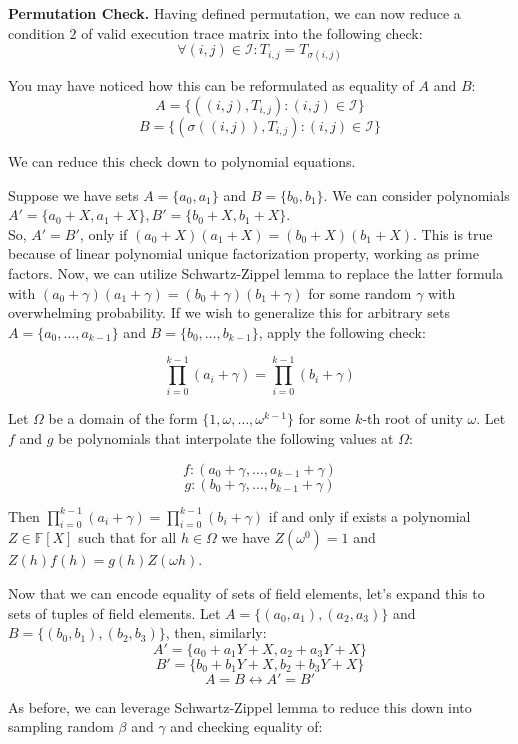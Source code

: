 \documentclass[../lecture-notes.tex]{subfiles}
\begin{document}
\textcolor{blue!80!black}{\textbf{Permutation Check.}} Having defined permutation, we can now reduce a condition $2$ of valid execution trace matrix into the following check:
\[\forall (i, j) \in \mathcal{I}: T_{i,j} = T_{\sigma(i,j)}\]

You may have noticed how this can be reformulated as equality of $A$ and $B$:
\[A = \{((i, j), T_{i,j}) : (i, j) \in \mathcal{I}\}\]
\[B = \{(\sigma((i, j)), T_{i,j}) : (i, j) \in \mathcal{I}\}\]

We can reduce this check down to polynomial equations.

Suppose we have sets \(A = \{a_0, a_1\}\) and \(B = \{b_0, b_1\}\). We can consider polynomials \(A' = \{a_0 + X, a_1 + X\}, B' = \{b_0 + X, b_1 + X\}\). 
\\
So, \(A' = B'\), only if \((a_0 + X)(a_1 + X) = (b_0 + X)(b_1 + X)\). This is
true because of linear polynomial unique factorization property, working as
prime factors. Now, we can utilize Schwartz-Zippel lemma to replace the latter
formula with \((a_0 + \gamma)(a_1 + \gamma) = (b_0 + \gamma)(b_1 + \gamma)\) for
some random $\gamma$ with overwhelming probability. If we wish to generalize this
for arbitrary sets \(A = \{a_0, \ldots, a_{k-1}\}\) and \(B = \{b_0, \ldots, b_{k-1}\}\), apply the following check:

\[\prod_{i=0}^{k-1} (a_i + \gamma) = \prod_{i=0}^{k-1} (b_i + \gamma)\]

Let $\Omega$ be a domain of the form \(\{1, \omega, \dots, \omega^{k-1}\}\) for some $k$-th root of unity $\omega$. Let $f$ and $g$ be polynomials that interpolate the following values at $\Omega$:

\[f: (a_0 + \gamma, \ldots, a_{k-1} + \gamma)\]
\[g: (b_0 + \gamma, \ldots, b_{k-1} + \gamma)\]

Then \(\prod_{i=0}^{k-1} (a_i + \gamma) = \prod_{i=0}^{k-1} (b_i + \gamma)\) if and only if exists a polynomial $Z \in \mathbb{F}[X]$ such that for all $h \in \Omega$ we have $Z(\omega^{0}) = 1$ and $Z(h)f(h) = g(h)Z(\omega h)$.

Now that we can encode equality of sets of field elements, let's expand this to sets of tuples of field elements. Let \(A = \{(a_0, a_1), (a_2, a_3)\}\) and \(B = \{(b_0, b_1), (b_2, b_3)\}\), then, similarly:
\[A' = \{a_0 + a_1Y + X, a_2 + a_3Y + X\}\]
\[B' = \{b_0 + b_1Y + X, b_2 + b_3Y + X\}\]
\[A = B \leftrightarrow A' = B'\]

As before, we can leverage Schwartz-Zippel lemma to reduce this down into sampling random $\beta$ and $\gamma$ and checking equality of:
\end{document}
